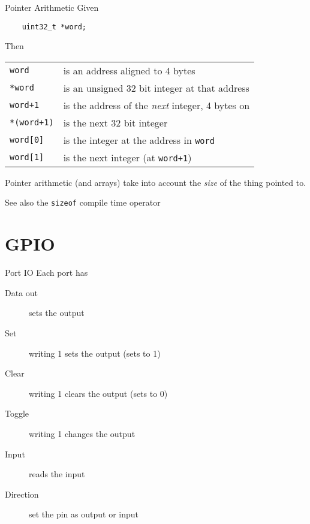 \documentclass[xcolor=svgnames]{beamer}
\begin{document}
\begin{frame}[fragile]{Pointer Arithmetic}
Given
\begin{verbatim}
    uint32_t *word;
\end{verbatim}
Then\\
\begin{tabular}{ll}
    \texttt{word} & is an address aligned to 4 bytes \\
    \texttt{*word} & is an unsigned 32 bit integer at that address \\
    \texttt{word+1} & is the address of the \emph{next} integer, \alert{4 bytes on} \\
    \texttt{*(word+1)} & is the \alert{next} 32 bit integer\\
    \texttt{word[0]} & is the integer \alert{at} the address in \texttt{word}\\
    \texttt{word[1]} & is the next integer (at \texttt{word+1})
\end{tabular}
Pointer arithmetic (and arrays) take into account the \emph{size} of the thing pointed to.

\begin{exampleblock}{See also}
    the \texttt{sizeof} compile time operator
\end{exampleblock}
\end{frame}


\part{GPIO}
\frame\partpage

\begin{frame}{Port IO}
    Each port has

\begin{description}
    \item[Data out] sets the output
    \item[Set   ] writing 1 sets the output (sets to 1)
    \item[Clear ] writing 1 clears the output (sets to 0)
    \item[Toggle] writing 1 changes the output
    \item[Input ] reads the input
    \item[Direction] set the pin as output or input
\end{description}

\end{frame}
\end{document}
